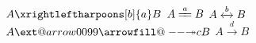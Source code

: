 \documentclass{article}
\begin{document}
$A \xrightleftharpoons[b]{a} B$
$A \xlongequal{a} B$
$A \xleftrightarrow{b} B$
$A \ext@arrow 0099{\arrowfill@\relbar\relbar\twoheadrightarrow}{}{c} B$
$A \xrightarrow{d} B$
\end{document}
